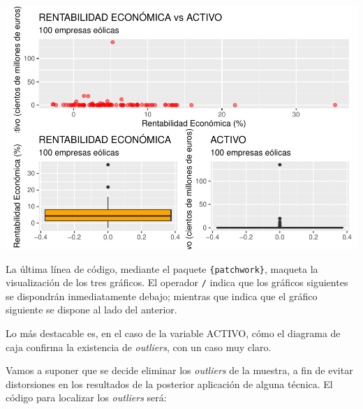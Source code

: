 \documentclass[
]{book}
\let\Oldincludegraphics\includegraphics
\renewcommand{\includegraphics}[2][]{%
  \Oldincludegraphics[#1]{#2}%
}
\begin{document}
\includegraphics{_main_files/figure-latex/unnamed-chunk-181-1.pdf}

La última línea de código, mediante el paquete \texttt{\{patchwork\}}, maqueta la visualización de los tres gráficos. El operador \texttt{/} indica que los gráficos siguientes se dispondrán inmediatamente debajo; mientras que \texttt{\textbar{}} indica que el gráfico siguiente se dispone al lado del anterior.

Lo más destacable es, en el caso de la variable ACTIVO, cómo el diagrama de caja confirma la existencia de \emph{outliers}, con un caso muy claro.

Vamos a suponer que se decide eliminar los \emph{outliers} de la muestra, a fin de evitar distorsiones en los resultados de la posterior aplicación de alguna técnica. El código para localizar los \emph{outliers} será:
\end{document}
